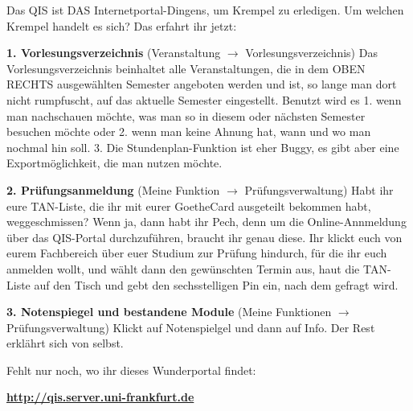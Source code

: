 Das QIS ist DAS Internetportal-Dingens, um Krempel zu erledigen.
Um welchen Krempel handelt es sich? Das erfahrt ihr jetzt:

\textbf{1. Vorlesungsverzeichnis} (Veranstaltung $\rightarrow$ Vorlesungsverzeichnis)
Das Vorlesungsverzeichnis beinhaltet alle Veranstaltungen, die in dem OBEN RECHTS ausgewählten
Semester angeboten werden und ist, so lange man dort nicht rumpfuscht, auf das aktuelle Semester eingestellt.
Benutzt wird es 1. wenn man nachschauen möchte, was man so in diesem oder nächsten Semester besuchen möchte oder
2. wenn man keine Ahnung hat, wann und wo man nochmal hin soll. 
3. Die Stundenplan-Funktion ist eher Buggy, es gibt aber eine Exportmöglichkeit, die man nutzen möchte.

\textbf{2. Prüfungsanmeldung} (Meine Funktion $\rightarrow$ Prüfungsverwaltung)
Habt ihr eure TAN-Liste, die ihr mit eurer GoetheCard ausgeteilt bekommen habt, weggeschmissen?
Wenn ja, dann habt ihr Pech, denn um die Online-Annmeldung über das QIS-Portal durchzuführen,
braucht ihr genau diese. Ihr klickt euch von eurem Fachbereich über euer Studium zur Prüfung hindurch, für die ihr euch anmelden wollt,
und wählt dann den gewünschten Termin aus, haut die TAN-Liste auf den Tisch und gebt den sechsstelligen Pin ein, nach dem gefragt wird.

\textbf{3. Notenspiegel und bestandene Module} (Meine Funktionen $\rightarrow$ Prüfungsverwaltung)
Klickt auf Notenspielgel und dann auf Info. Der Rest erklährt sich von selbst.

Fehlt nur noch, wo ihr dieses Wunderportal findet:\\
\begin{center}\large\textbf{\url{http://qis.server.uni-frankfurt.de}}\end{center}
